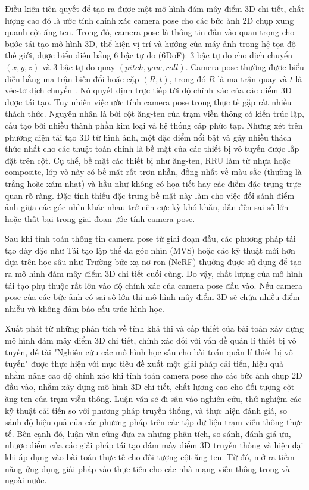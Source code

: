 Điều kiện tiên quyết để tạo ra được một mô hình đám mây điểm 3D chi tiết, chất lượng cao đó là ước tính chính xác camera pose cho các bức ảnh 2D chụp xung quanh cột ăng-ten. Trong đó, camera pose là thông tin đầu vào quan trọng cho bước tái tạo mô hình 3D, thể hiện vị trí và hướng của máy ảnh trong hệ tọa độ thế giới, được biểu diễn bằng 6 bậc tự do (6DoF): 3 bậc tự do cho dịch chuyển $(x, y, z)$ và 3 bậc tự do quay $(pitch, yaw, roll)$. Camera pose thường được biểu diễn bằng ma trận biến đổi hoặc cặp $(R, t)$, trong đó $R$ là ma trận quay và $t$ là véc-tơ dịch chuyển \cite{xu2022critical}. Nó quyết định trực tiếp tới độ chính xác của các điểm 3D được tái tạo. Tuy nhiên việc ước tính camera pose trong thực tế gặp rất nhiều thách thức. Nguyên nhân là bởi cột ăng-ten của trạm viễn thông có kiến trúc lặp, cấu tạo bởi nhiều thành phần kim loại và hệ thống cáp phức tạp. Nhưng xét trên phương diện tái tạo 3D từ hình ảnh, một đặc điểm nổi bật và gây nhiều thách thức nhất cho các thuật toán chính là bề mặt của các thiết bị vô tuyến được lắp đặt trên cột. Cụ thể, bề mặt các thiết bị như ăng-ten, RRU làm từ nhựa hoặc composite, lớp vỏ này có bề mặt rất trơn nhẵn, đồng nhất về màu sắc (thường là trắng hoặc xám nhạt) và hầu như không có họa tiết hay các điểm đặc trưng trực quan rõ ràng. Đặc tính thiếu đặc trưng bề mặt này làm cho việc đối sánh điểm ảnh giữa các góc nhìn khác nhau trở nên cực kỳ khó khăn, dẫn đến sai số lớn hoặc thất bại trong giai đoạn ước tính camera pose.

Sau khi tính toán thông tin camera pose từ giai đoạn đầu, các phương pháp tái tạo dày đặc như Tái tạo lập thể đa góc nhìn (MVS) hoặc các kỹ thuật mới hơn dựa trên học sâu như Trường bức xạ nơ-ron (NeRF) thường được sử dụng để tạo ra mô hình đám mây điểm 3D chi tiết cuối cùng. Do vậy, chất lượng của mô hình tái tạo phụ thuộc rất lớn vào độ chính xác của camera pose đầu vào. Nếu camera pose của các bức ảnh có sai số lớn thì mô hình mây điểm 3D sẽ chứa nhiều điểm nhiễu và không đảm bảo cấu trúc hình học.

Xuất phát từ những phân tích về tính khả thi và cấp thiết của bài toán xây dựng mô hình đám mây điểm 3D chi tiết, chính xác đối với vấn đề quản lí thiết bị vô tuyến, đề tài "Nghiên cứu các mô hình học sâu cho bài toán quản lí thiết bị vô tuyến" được thực hiện với mục tiêu đề xuất một giải pháp cải tiến, hiệu quả nhằm nâng cao độ chính xác khi tính toán camera pose cho các bức ảnh chụp 2D đầu vào, nhằm xây dựng mô hình 3D chi tiết, chất lượng cao cho đối tượng cột ăng-ten của trạm viễn thông. Luận văn sẽ đi sâu vào nghiên cứu, thử nghiệm các kỹ thuật cải tiến so với phương pháp truyền thống, và thực hiện đánh giá, so sánh độ hiệu quả của các phương pháp trên các tập dữ liệu trạm viễn thông thực tế. Bên cạnh đó, luận văn cũng đưa ra những phân tích, so sánh, đánh giá ưu, nhược điểm của các giải pháp tái tạo đám mây điểm 3D truyền thống và hiện đại khi áp dụng vào bài toán thực tế cho đối tượng cột ăng-ten. Từ đó, mở ra tiềm năng ứng dụng giải pháp vào thực tiễn cho các nhà mạng viễn thông trong và ngoài nước.

